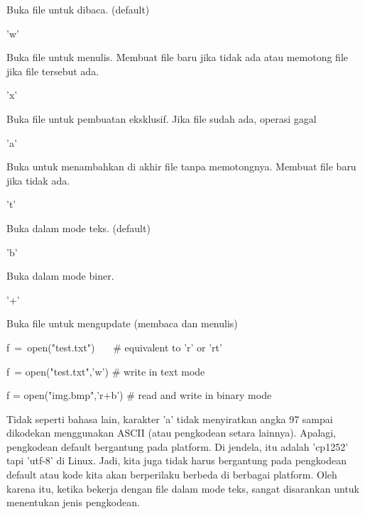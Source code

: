 \noindent 
Buka file untuk dibaca. (default) \par
\vspace{12pt}
\noindent 
'w' \hspace*{0.5in}  \par
\noindent 
Buka file untuk menulis. Membuat file baru jika tidak ada atau memotong file jika file tersebut ada. \par
\vspace{12pt}
\noindent 
'x' \hspace*{0.5in}  \par
\noindent 
Buka file untuk pembuatan eksklusif. Jika file sudah ada, operasi gagal \par
\vspace{12pt}
\noindent 
'a' \hspace*{0.5in}  \par
\noindent 
Buka untuk menambahkan di akhir file tanpa memotongnya. Membuat file baru jika tidak ada. \par
\vspace{12pt}
\noindent 
't' \hspace*{0.5in}  \par
\noindent 
Buka dalam mode teks. (default) \par
\vspace{12pt}
\noindent 
'b' \par
\noindent 
Buka dalam mode biner. \par
\vspace{12pt}
\noindent 
'+' \par
\noindent 
Buka file untuk mengupdate (membaca dan menulis) \par
\vspace{12pt}
\noindent 
f~=~open("test.txt")~~~    $  \#  $ equivalent to 'r' or 'rt' \par
\noindent 
f~= open("test.txt",'w')   $  \#  $ write in text mode \par
\noindent 
f = open("img.bmp",'r+b')  $  \#  $ read and write in binary mode \par
\vspace{12pt}
\noindent 
Tidak seperti bahasa lain, karakter 'a' tidak menyiratkan angka 97 sampai dikodekan menggunakan ASCII (atau pengkodean setara lainnya). Apalagi, pengkodean default bergantung pada platform. Di jendela, itu adalah 'cp1252' tapi 'utf-8' di Linux. Jadi, kita juga tidak harus bergantung pada pengkodean default atau kode kita akan berperilaku berbeda di berbagai platform. Oleh karena itu, ketika bekerja dengan file dalam mode teks, sangat disarankan untuk menentukan jenis pengkodean. \par
